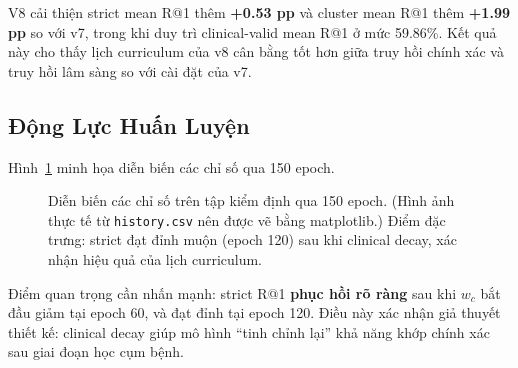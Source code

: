 \documentclass[12pt, a4paper]{article}
\begin{document}
V8 cải thiện strict mean R@1 thêm \textbf{+0.53 pp} và cluster mean R@1 thêm
\textbf{+1.99 pp} so với v7, trong khi duy trì clinical-valid mean R@1 ở mức
59.86\%. Kết quả này cho thấy lịch curriculum của v8 cân bằng tốt hơn giữa
truy hồi chính xác và truy hồi lâm sàng so với cài đặt của v7.

\subsection{Động Lực Huấn Luyện}

Hình~\ref{fig:training_dynamics} minh họa diễn biến các chỉ số qua 150 epoch.

\begin{figure}[H]
  \centering
  \caption{Diễn biến các chỉ số trên tập kiểm định qua 150 epoch.
    (Hình ảnh thực tế từ \texttt{history.csv} nên được vẽ bằng matplotlib.)
    Điểm đặc trưng: strict đạt đỉnh muộn (epoch 120) sau khi clinical decay,
    xác nhận hiệu quả của lịch curriculum.}
  \label{fig:training_dynamics}
\end{figure}

Điểm quan trọng cần nhấn mạnh: strict R@1 \textbf{phục hồi rõ ràng} sau khi
$w_c$ bắt đầu giảm tại epoch 60, và đạt đỉnh tại epoch 120. Điều này xác nhận
giả thuyết thiết kế: clinical decay giúp mô hình ``tinh chỉnh lại'' khả năng
khớp chính xác sau giai đoạn học cụm bệnh.
\end{document}
